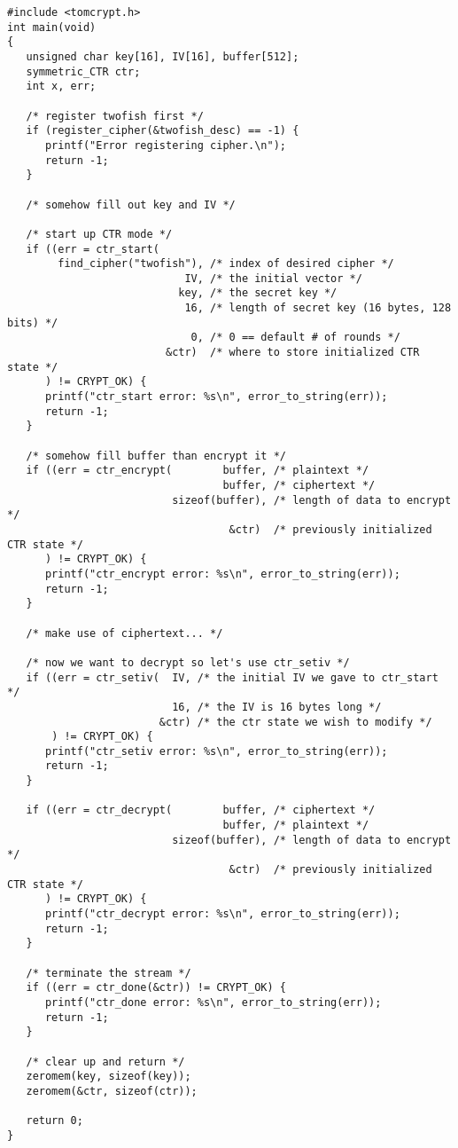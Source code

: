 \documentclass[a4paper]{book}
\begin{document}
\newpage
\begin{small}
\begin{verbatim}
#include <tomcrypt.h>
int main(void)
{
   unsigned char key[16], IV[16], buffer[512];
   symmetric_CTR ctr;
   int x, err;

   /* register twofish first */
   if (register_cipher(&twofish_desc) == -1) {
      printf("Error registering cipher.\n");
      return -1;
   }

   /* somehow fill out key and IV */

   /* start up CTR mode */
   if ((err = ctr_start(
        find_cipher("twofish"), /* index of desired cipher */
                            IV, /* the initial vector */
                           key, /* the secret key */
                            16, /* length of secret key (16 bytes, 128 bits) */
                             0, /* 0 == default # of rounds */
                         &ctr)  /* where to store initialized CTR state */
      ) != CRYPT_OK) {
      printf("ctr_start error: %s\n", error_to_string(err));
      return -1;
   }

   /* somehow fill buffer than encrypt it */
   if ((err = ctr_encrypt(        buffer, /* plaintext */
                                  buffer, /* ciphertext */
                          sizeof(buffer), /* length of data to encrypt */
                                   &ctr)  /* previously initialized CTR state */
      ) != CRYPT_OK) {
      printf("ctr_encrypt error: %s\n", error_to_string(err));
      return -1;
   }

   /* make use of ciphertext... */

   /* now we want to decrypt so let's use ctr_setiv */
   if ((err = ctr_setiv(  IV, /* the initial IV we gave to ctr_start */
                          16, /* the IV is 16 bytes long */
                        &ctr) /* the ctr state we wish to modify */
       ) != CRYPT_OK) {
      printf("ctr_setiv error: %s\n", error_to_string(err));
      return -1;
   }

   if ((err = ctr_decrypt(        buffer, /* ciphertext */
                                  buffer, /* plaintext */
                          sizeof(buffer), /* length of data to encrypt */
                                   &ctr)  /* previously initialized CTR state */
      ) != CRYPT_OK) {
      printf("ctr_decrypt error: %s\n", error_to_string(err));
      return -1;
   }

   /* terminate the stream */
   if ((err = ctr_done(&ctr)) != CRYPT_OK) {
      printf("ctr_done error: %s\n", error_to_string(err));
      return -1;
   }

   /* clear up and return */
   zeromem(key, sizeof(key));
   zeromem(&ctr, sizeof(ctr));

   return 0;
}
\end{verbatim}
\end{small}
\end{document}
